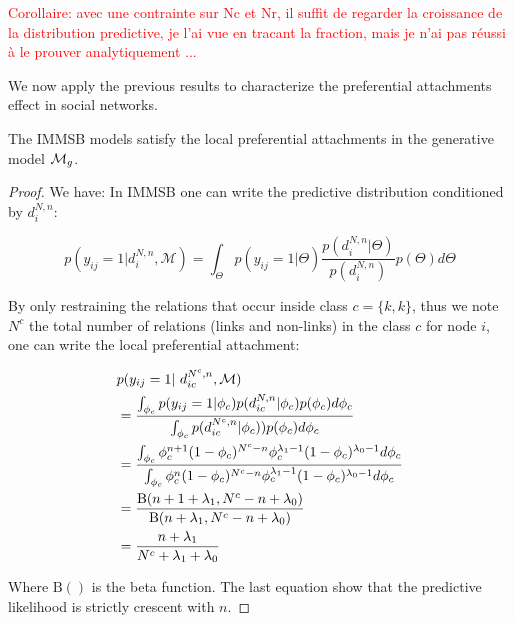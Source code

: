 \textcolor{red}{Corollaire:  avec une contrainte sur Nc et Nr, il suffit de regarder la croissance de la distribution predictive, je l'ai vue en tracant la fraction, mais je n'ai pas réussi à le prouver analytiquement ...}



We now apply the previous results to characterize the preferential attachments effect in social networks.


\begin{proposition}
	The IMMSB models satisfy the local preferential attachments in the generative model $\mathcal{M}_g$.
\end{proposition}

\begin{proof}
We have:
In IMMSB one can write the predictive distribution conditioned by $d_i^{N,n}$:

\begin{equation} 
p(y_{ij} = 1 | d_i^{N,n}, \mathcal{M}) = \int_{\Theta} p(y_{ij}=1|\Theta) \frac{p(d_i^{N,n} | \Theta)}{p(d_i^{N,n})} p(\Theta) d\Theta \nonumber
\end{equation}

By only restraining the relations that occur inside class $c=\{k,k\}$, thus we note $N^c$ the total number of relations (links and non-links) in the class $c$ for node $i$, one can write the local preferential attachment:

\begin{align*} \label{eq:sum}
&p(y_{ij} = 1 | d_{ic}^{N^c,n}, \mathcal{M})  \\
&=  \frac{ \int_{\phi_{c}} p(y_{ij}=1|\phi_{c}) p(d_{ic}^{N,n} | \phi_{c}) p(\phi_{c}) d\phi_{c}}{\int_{\phi_{c}} \p(d_{ic}^{N^c,n} | \phi_{c}))       p(\phi_{c}) d\phi_{c}}   \\
&= \frac{\int_{\phi_c} \phi_c^{n+1}(1-\phi_c)^{N^c-n} \phi_c^{\lambda_1-1} (1-\phi_c)^{\lambda_0-1} d\phi_{c}}{\int_{\phi_c} \phi_c^{n}(1-\phi_c)^{N^c-n} \phi_c^{\lambda_1-1} (1-\phi_c)^{\lambda_0-1} d\phi_{c}} \\
&= \frac{ \text{B}(n+1+\lambda_1, N^c-n+\lambda_0) }{\text{B}(n+\lambda_1, N^c-n+\lambda_0)} \\
&= \frac{n+\lambda_1}{N^c + \lambda_1 +\lambda_0}
\end{align*}

Where $\text{B}()$ is the beta function. The last equation show that the predictive likelihood is strictly crescent with $n$.

\end{proof}

